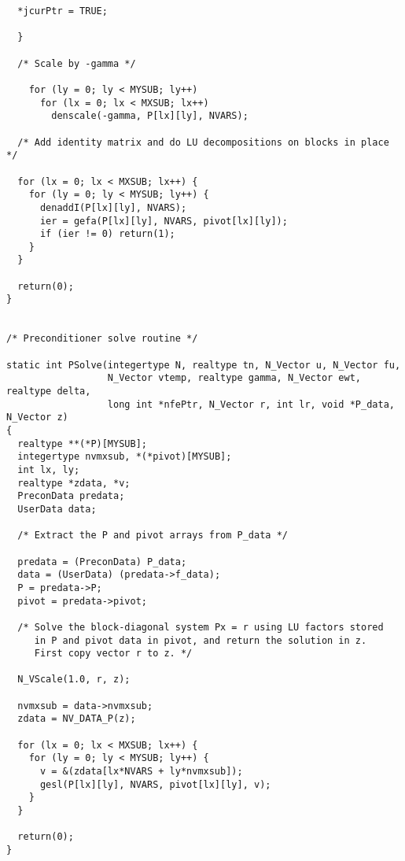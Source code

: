 \begin{verbatim}
  *jcurPtr = TRUE;

  }

  /* Scale by -gamma */

    for (ly = 0; ly < MYSUB; ly++)
      for (lx = 0; lx < MXSUB; lx++)
        denscale(-gamma, P[lx][ly], NVARS);

  /* Add identity matrix and do LU decompositions on blocks in place */

  for (lx = 0; lx < MXSUB; lx++) {
    for (ly = 0; ly < MYSUB; ly++) {
      denaddI(P[lx][ly], NVARS);
      ier = gefa(P[lx][ly], NVARS, pivot[lx][ly]);
      if (ier != 0) return(1);
    }
  }

  return(0);
}


/* Preconditioner solve routine */

static int PSolve(integertype N, realtype tn, N_Vector u, N_Vector fu, 
                  N_Vector vtemp, realtype gamma, N_Vector ewt, realtype delta, 
                  long int *nfePtr, N_Vector r, int lr, void *P_data, N_Vector z)
{
  realtype **(*P)[MYSUB];
  integertype nvmxsub, *(*pivot)[MYSUB];
  int lx, ly;
  realtype *zdata, *v;
  PreconData predata;
  UserData data;

  /* Extract the P and pivot arrays from P_data */

  predata = (PreconData) P_data;
  data = (UserData) (predata->f_data);
  P = predata->P;
  pivot = predata->pivot;

  /* Solve the block-diagonal system Px = r using LU factors stored
     in P and pivot data in pivot, and return the solution in z.
     First copy vector r to z. */

  N_VScale(1.0, r, z);

  nvmxsub = data->nvmxsub;
  zdata = NV_DATA_P(z);

  for (lx = 0; lx < MXSUB; lx++) {
    for (ly = 0; ly < MYSUB; ly++) {
      v = &(zdata[lx*NVARS + ly*nvmxsub]);
      gesl(P[lx][ly], NVARS, pivot[lx][ly], v);
    }
  }

  return(0);
}
\end{verbatim}